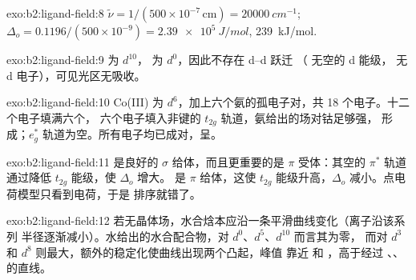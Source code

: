 \begin{solution}{exo:b2:ligand-field:8}
$\tilde\nu = 1/(500 \times 10^{-7}\,\text{cm}) = \qty{20000}{cm^{-1}}$; $\Delta_o =
0.1196/(500 \times 10^{-9}) = \qty{2.39e5}{J/mol}$, \qty{239}{kJ/mol}.
\end{solution}

\begin{solution}{exo:b2:ligand-field:9}
 为 $d^{10}$， 为 $d^0$，因此不存在 d–d 跃迁
（ 无空的 d 能级， 无 d 电子），可见光区无吸收。
\end{solution}

\begin{solution}{exo:b2:ligand-field:10}
Co(III) 为 $d^6$，加上六个氨的孤电子对，共 18 个电子。十二个电子填满六个，
六个电子填入非键的 $t_{2g}$ 轨道，氨给出的场对钴足够强，
形成；$e_g^*$ 轨道为空。所有电子均已成对，呈。
\end{solution}

\begin{solution}{exo:b2:ligand-field:11}
 是良好的 $\sigma$ 给体，而且更重要的是 $\pi$ 受体：其空的 $\pi^*$ 轨道
通过降低 $t_{2g}$ 能级，使 $\Delta_o$ 增大。 是 $\pi$ 给体，这使
$t_{2g}$ 能级升高，$\Delta_o$ 减小。点电荷模型只看到电荷，于是
排序就错了。
\end{solution}

\begin{solution}{exo:b2:ligand-field:12}
若无晶体场，水合焓本应沿一条平滑曲线变化（离子沿该系列
半径逐渐减小）。水给出的水合配合物，对 $d^0$、$d^5$、$d^{10}$ 而言其为零，
而对 $d^3$ 和 $d^8$ 则最大，额外的稳定化使曲线出现两个凸起，峰值
靠近  和 ，高于经过 、、 的直线。
\end{solution}

